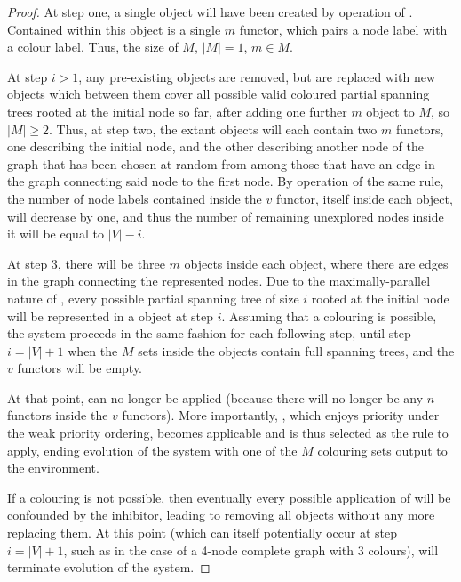 \begin{proof}

At step one, a single \bo{} object will have been created by operation of .  Contained within this \bo{} object is a single \(m\) \gls{functor}, which pairs a node label with a colour label.  Thus, the size of \(M\), \(|M| = 1\), \(m \in M\).

At step \(i > 1\), any pre-existing \bo{} objects are removed, but are replaced with new \bo{} objects which between them cover all possible valid coloured partial spanning trees rooted at the initial node so far, after adding one further \(m\) object to \(M\), so \(|M| \geq 2\).  Thus, at step two, the extant \bo{} objects will each contain two \(m\) \glspl{functor}, one describing the initial node, and the other describing another node of the graph that has been chosen at random from among those that have an edge in the graph connecting said node to the first node.  By operation of the same rule, the number of node labels contained inside the \(v\) \gls{functor}, itself inside each \bo{} object, will decrease by one, and thus the number of remaining unexplored nodes inside it will be equal to \(|V| - i\).

At step 3, there will be three \(m\) objects inside each \bo{} object, where there are edges in the graph connecting the represented nodes.  Due to the maximally-parallel nature of , every possible partial spanning tree of size \(i\) rooted at the initial node will be represented in a \bo{} object at step \(i\).  Assuming that a colouring is possible, the system proceeds in the same fashion for each following step, until step \(i = |V| + 1\) when the \(M\) sets inside the \bo{} objects contain full spanning trees, and the \(v\) \glspl{functor} will be empty.

At that point,  can no longer be applied (because there will no longer be any \(n\) \glspl{functor} inside the \(v\) \glspl{functor}).  More importantly, , which enjoys priority under the weak priority ordering, becomes applicable and is thus selected as the rule to apply, ending evolution of the system with one of the \(M\) colouring sets output to the environment.

If a colouring is not possible, then eventually every possible application of  will be confounded by the \gls{inhibitor}, leading to  removing all \bo{} objects without any more replacing them.  At this point (which can itself potentially occur at step \(i = |V| + 1\), such as in the case of a 4-node complete graph with 3 colours),  will terminate evolution of the system.
\end{proof}

